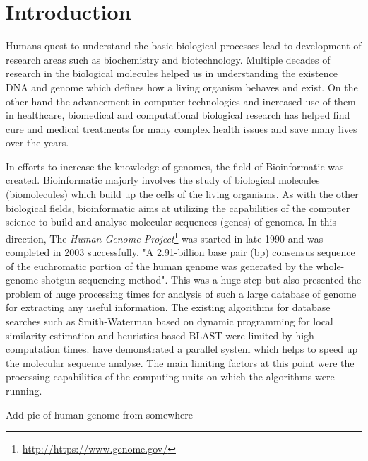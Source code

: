 \documentclass[12pt,twoside]{article}
\begin{document}
\section{Introduction}
\label{sec:introduction}

Humans quest to understand the basic biological processes lead to development of research areas such as
biochemistry and biotechnology. Multiple decades of research in the biological molecules helped us in
understanding the existence DNA and genome which defines how a living organism behaves and exist.
On the other hand the advancement in computer technologies and increased use of them in healthcare, biomedical
and computational biological research has helped find cure and medical treatments for many complex health
issues and save many lives over the years.

In efforts to increase the knowledge of genomes, the field of Bioinformatic was created. Bioinformatic majorly involves
the study of biological molecules (biomolecules) which build up the cells of the living organisms. As with the other biological fields,
bioinformatic aims at utilizing the capabilities of the computer science to build and analyse molecular sequences (genes) of genomes.
In this direction, The \emph{Human Genome Project}\footnote{\url{http://https://www.genome.gov/}}  was started in late 1990 and was
completed in 2003 successfully. "A 2.91-billion base pair (bp) consensus sequence of the euchromatic portion of
the human genome was generated by the whole-genome shotgun sequencing method"\cite{venter_sequence_2001}. This was a huge
step but also presented the problem of huge processing times for analysis of such a large database of genome for extracting any
useful information. The existing algorithms for database searches such as Smith-Waterman \cite{smith_identification_1981} based
on dynamic programming for local similarity estimation and heuristics based BLAST \cite{altschul_basic_1990} were limited by
high computation times. \textcite{schmidt_massively_2002} have demonstrated a parallel system which helps to speed up the 
molecular sequence analyse. The main limiting factors at this point were the processing capabilities of the computing units
on which the algorithms were running.

{Add pic of human genome from somewhere}
\end{document}
